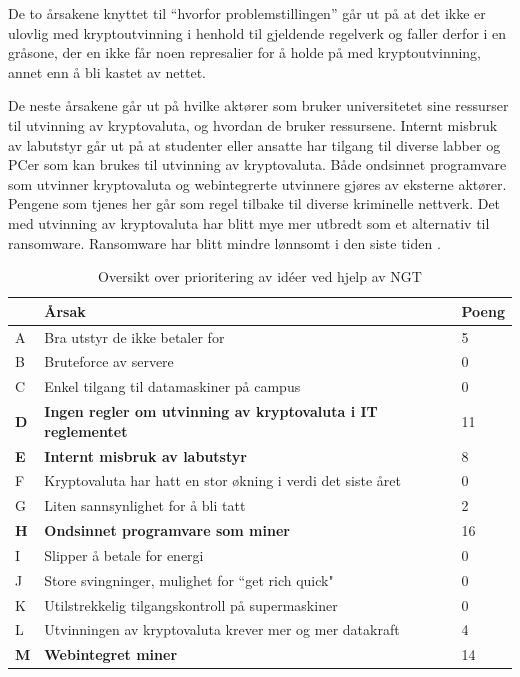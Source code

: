 De to årsakene knyttet til ``hvorfor problemstillingen'' går ut på at det ikke er ulovlig med kryptoutvinning i henhold til gjeldende regelverk og faller derfor i en gråsone, der en ikke får noen represalier for å holde på med kryptoutvinning, annet enn å bli kastet av nettet.

De neste årsakene går ut på hvilke aktører som bruker universitetet sine ressurser til utvinning av kryptovaluta, og hvordan de bruker ressursene. Internt misbruk av labutstyr går ut på at studenter eller ansatte har tilgang til diverse labber og PCer som kan brukes til utvinning av kryptovaluta. Både ondsinnet programvare som utvinner kryptovaluta og webintegrerte utvinnere gjøres av eksterne aktører. Pengene som tjenes her går som regel tilbake til diverse kriminelle nettverk. Det med utvinning av kryptovaluta har blitt mye mer utbredt som et alternativ til ransomware. Ransomware har blitt mindre lønnsomt i den siste tiden \cite{RW}.

\begin{table} [H]
    \begin{tabular}{ | m{2em} | m{30em} | m{3em} | }
        \hline
            \cellcolor{yellow}  & \cellcolor{yellow} \textbf{Årsak} & \cellcolor{yellow} Poeng \\
        \hline
           A& Bra utstyr de ikke betaler for & 5 \\
        \hline
          B & Bruteforce av servere & 0 \\
        \hline
          C & Enkel tilgang til datamaskiner på campus & 0 \\
        \hline
         \textbf{D} & \textbf{Ingen regler om utvinning av kryptovaluta i IT reglementet} & 11 \\
        \hline
          \textbf{E} & \textbf{Internt misbruk av labutstyr} & 8  \\
        \hline
          F & Kryptovaluta har hatt en stor økning i verdi det siste året & 0 \\
        \hline
         G & Liten sannsynlighet for å bli tatt & 2 \\
        \hline
         \textbf{H} & \textbf{Ondsinnet programvare som miner} &  16 \\
        \hline
         I & Slipper å betale for energi & 0 \\
        \hline
         J & Store svingninger, mulighet for “get rich quick" & 0 \\
        \hline
         K & Utilstrekkelig tilgangskontroll på supermaskiner & 0 \\
        \hline
         L & Utvinningen av kryptovaluta krever mer og mer datakraft & 4 \\
        \hline
         \textbf{M} & \textbf{Webintegret miner} & 14 \\
        \hline
    \end{tabular}
    \caption{Oversikt over prioritering av idéer ved hjelp av NGT}
    \label{tab:NGT}
\end{table}

